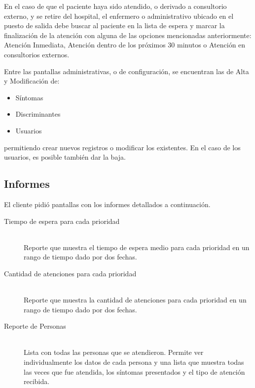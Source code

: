 En el caso de que el paciente haya sido atendido, o derivado a consultorio externo, y se retire del hospital, el enfermero o administrativo ubicado en el puesto de salida debe buscar al paciente en la lista de espera y marcar la finalización de la atención con alguna de las opciones mencionadas anteriormente: Atención Inmediata, Atención dentro de los próximos 30 minutos o Atención en consultorios externos.

Entre las pantallas administrativas, o de configuración, se encuentran las de Alta y Modificación de:
\begin{itemize}
\item Síntomas
\item Discriminantes
\item Usuarios
\end{itemize}
%
permitiendo crear nuevos registros o modificar los existentes. En el caso de los usuarios, es posible también dar la baja.




\subsection{Informes}
El cliente pidió pantallas con los informes detallados a continuación.

\begin{description}
\item[Tiempo de espera para cada prioridad]  \mbox{} \\
Reporte que muestra el tiempo de espera medio para cada prioridad en un rango de tiempo dado por dos fechas. 


\item[Cantidad de atenciones para cada prioridad]\mbox{} \\
Reporte que muestra la cantidad de atenciones para cada prioridad en un rango de tiempo dado por dos fechas.

\item[Reporte de Personas] \mbox{} \\
Lista con todas las personas que se atendieron. Permite ver individualmente los datos de cada persona y una lista que muestra todas las veces que fue atendida, los síntomas presentados y el tipo de atención recibida.
\end{description}
